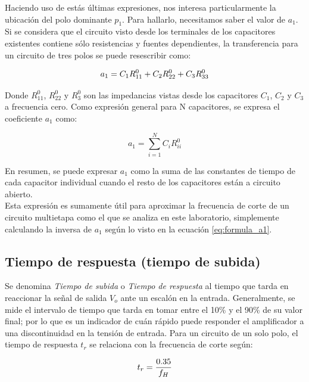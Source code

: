 \documentclass[letterpaper, 10 pt, conference]{ieeeconf}  %
\begin{document}
Haciendo uso de estás últimas expresiones, nos interesa particularmente la ubicación del polo dominante $p_1$. Para hallarlo, necesitamos saber el valor de $a_1$.
Si se considera que el circuito visto desde los terminales de los capacitores existentes contiene sólo resistencias y fuentes dependientes, la transferencia para un circuito de tres polos se puede resescribir como:

\begin{equation}
a_1 = C_1R_{11}^0 + C_2R_{22}^0 + C_3R_{33}^0\\
\end{equation}

Donde $R_{11}^0$, $R_{22}^0$ y $R_{3}^0$ son las impedancias vistas desde los capacitores $C_1$, $C_2$ y $C_3$ a frecuencia cero.
Como expresión general para N capacitores, se expresa el coeficiente $a_1$ como:

\begin{equation}
a_1 = \sum_{i=1}^N C_iR_{ii}^0
\label{eq:formula_a1}
\end{equation}

En resumen, se puede expresar $a_1$ como la suma de las constantes de tiempo de cada capacitor individual cuando el resto de los capacitores están a circuito abierto. \\
Esta expresión es sumamente útil para aproximar la frecuencia de corte de un circuito multietapa como el que se analiza en este laboratorio, simplemente calculando la inversa de $a_1$ según lo visto en la ecuación \ref{eq:formula_a1}.

\subsection{\textbf{Tiempo de respuesta (tiempo de subida)}}

Se denomina \textit{Tiempo de subida} o \textit{Tiempo de respuesta} al tiempo que tarda en reaccionar la señal de salida $V_o$ ante un escalón en la entrada. Generalmente, se mide el intervalo de tiempo que tarda en tomar entre el 10\% y el 90\% de su valor final; por lo que es un indicador de cuán rápido puede responder el amplificador a una discontinuidad en la tensión de entrada.
Para un circuito de un solo polo, el tiempo de respuesta $t_r$ se relaciona con la frecuencia de corte según:

\begin{equation}
    t_r = \frac{0.35}{f_H}\\
\end{equation}
\end{document}
